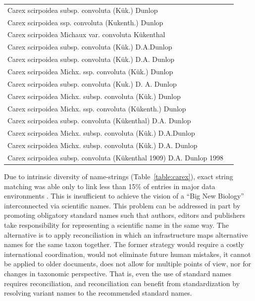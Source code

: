 \documentclass{bmcart}
\begin{document}
\begin{table}[!htb]
\begin{center}
\begin{tabular}{| l | c |}
    Carex scirpoidea subsp. convoluta (Kük.) Dunlop & \\
    Carex scirpoidea ssp. convoluta (Kukenth.) Dunlop & \\
    Carex scirpoidea Michaux var. convoluta Kükenthal & \\
    Carex scirpoidea subsp. convoluta (Kük.) D.A.Dunlop & \\
    Carex scirpoidea subsp. convoluta (Kük.) D.A. Dunlop & \\
    Carex scirpoidea Michx. ssp. convoluta (Kük.) Dunlop & \\
    Carex scirpoidea subsp. convoluta (Kuk.) D. A. Dunlop & \\
    Carex scirpoidea Michx. subsp. convoluta (Kük.) Dunlop & \\
    Carex scirpoidea Michx. ssp. convoluta (Kükenth.) Dunlop & \\
    Carex scirpoidea subsp. convoluta (Kükenthal) D.A. Dunlop & \\
    Carex scirpoidea Michx. subsp. convoluta (Kük.) D.A.Dunlop & \\
    Carex scirpoidea Michx. subsp. convoluta (Kük.) D.A. Dunlop & \\
    Carex scirpoidea subsp. convoluta (Kükenthal 1909) D.A. Dunlop 1998 & \\
    \hline
    \end{tabular}
  \end{center}
\end{table}

Due to intrinsic diversity of name-strings (Table~\ref{table:carex}), exact
string matching was able only to link less than 15\% of entries in major data
environments \cite{Patterson:inpress-a}. This is insufficient to achieve the
vision of a ``Big New Biology'' interconnected via scientific names. This
problem can be addressed in part by promoting obligatory standard names such
that authors, editors and publishers take responsibility for representing a
scientific name in the same way. The alternative is to apply reconciliation in
which an infrastructure maps alternative names for the same taxon together.
The former strategy would require a costly international coordination, would
not eliminate future human mistakes, it cannot be applied to older documents,
does not allow for multiple points of view, nor for changes in taxonomic
perspective. That is, even the use of standard names requires reconciliation,
and reconciliation can benefit from standardization by resolving variant names
to the recommended standard names.
\end{document}
